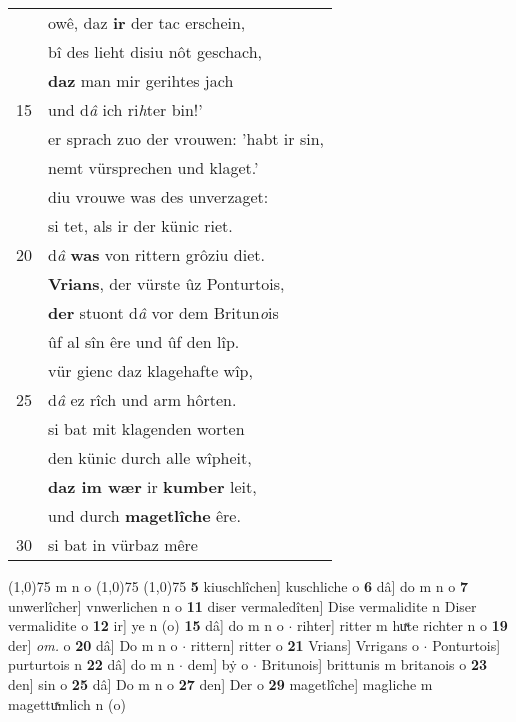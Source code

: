 \documentclass[8pt,a4paper,notitlepage]{article}
\begin{document}
\begin{table}[ht]
\begin{minipage}[t]{0.5\linewidth}
\begin{tabular}{rl}
 & owê, daz \textbf{ir} der tac erschein,\\ 
 & bî des lieht disiu nôt geschach,\\ 
 & \textbf{daz} man mir gerihtes jach\\ 
15 & und d\textit{â} ich ri\textit{h}ter bin!'\\ 
 & er sprach zuo der vrouwen: 'habt ir sin,\\ 
 & nemt vürsprechen und klaget.'\\ 
 & diu vrouwe was des unverzaget:\\ 
 & si tet, als ir der künic riet.\\ 
20 & d\textit{â} \textbf{was} von rittern grôziu diet.\\ 
 & \textbf{Vrians}, der vürste ûz Ponturtois,\\ 
 & \textbf{der} stuont d\textit{â} vor dem Britun\textit{o}is\\ 
 & ûf al sîn êre und ûf den lîp.\\ 
 & vür gienc daz klagehafte wîp,\\ 
25 & d\textit{â} ez rîch und arm hôrten.\\ 
 & si bat mit klagenden worten\\ 
 & den künic durch alle wîpheit,\\ 
 & \textbf{daz im wær} ir \textbf{kumber} leit,\\ 
 & und durch \textbf{magetlîche} êre.\\ 
30 & si bat in vürbaz mêre\\ 
\end{tabular}
\scriptsize
\line(1,0){75} \newline
m n o \newline
\line(1,0){75} \newline
\newline
\line(1,0){75} \newline
\textbf{5} kiuschlîchen] kuschliche o \textbf{6} dâ] do m n o \textbf{7} unwerlîcher] vnwerlichen n o \textbf{11} diser vermaledîten] Dise vermalidite n Diser vermalidite o \textbf{12} ir] ye n (o) \textbf{15} dâ] do m n o  $\cdot$ rihter] ritter m huͯte richter n o \textbf{19} der] \textit{om.} o \textbf{20} dâ] Do m n o  $\cdot$ rittern] ritter o \textbf{21} Vrians] Vrrigans o  $\cdot$ Ponturtois] purturtois n \textbf{22} dâ] do m n  $\cdot$ dem] bẏ o  $\cdot$ Britunois] brittunis m britanois o \textbf{23} den] sin o \textbf{25} dâ] Do m n o \textbf{27} den] Der o \textbf{29} magetlîche] magliche m magettuͯmlich n (o) \newline
\end{minipage}
\end{table}
\end{document}
